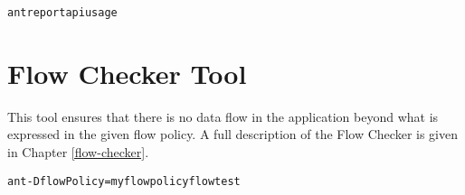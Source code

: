 \begin{alltt}
ant reportapiusage
\end{alltt}

\section{Flow Checker Tool\label{sec:checkertool}}

This tool ensures that there is no data flow in the application beyond what is expressed in the given flow policy.  A full description of the Flow Checker is given in Chapter \ref{flow-checker}. 

\begin{alltt}
ant -DflowPolicy=myflowpolicy flowtest
\end{alltt}


